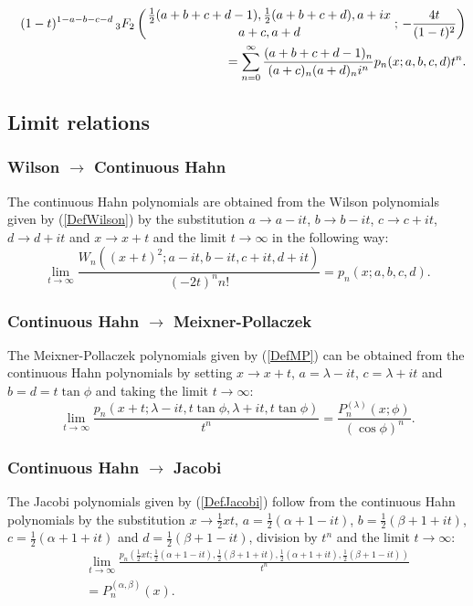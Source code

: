 \documentclass[envcountchap,graybox]{svmono}
\newcounter{rom}
\newcommand{\hyp}[5]{\mbox{}_{#1}{F}_{#2}
\left(\genfrac{}{}{0pt}{}{#3}{#4}\,;\,#5\right)}
\begin{document}
\begin{eqnarray}
\label{GenContHahn3}
& &(1-t)^{1-a-b-c-d}\,\hyp{3}{2}{\frac{1}{2}(a+b+c+d-1),\frac{1}{2}(a+b+c+d),a+ix}
{a+c,a+d}{-\frac{4t}{(1-t)^2}}\nonumber\\
& &{}=\sum_{n=0}^{\infty}
\frac{(a+b+c+d-1)_n}{(a+c)_n(a+d)_ni^n}p_n(x;a,b,c,d)t^n.
\end{eqnarray}

\subsection*{Limit relations}

\subsubsection*{Wilson $\rightarrow$ Continuous Hahn}
The continuous Hahn polynomials are obtained from the Wilson polynomials given by
(\ref{DefWilson}) by the substitution $a\rightarrow a-it$, $b\rightarrow b-it$,
$c\rightarrow c+it$, $d\rightarrow d+it$ and $x\rightarrow x+t$ and the limit
$t\rightarrow\infty$ in the following way:
$$\lim_{t\rightarrow\infty}
\frac{W_n((x+t)^2;a-it,b-it,c+it,d+it)}{(-2t)^nn!}=p_n(x;a,b,c,d).$$

\subsubsection*{Continuous Hahn $\rightarrow$ Meixner-Pollaczek}
The Meixner-Pollaczek polynomials given by (\ref{DefMP}) can be obtained from the
continuous Hahn polynomials by setting $x\rightarrow x+t$, $a=\lambda-it$, $c=\lambda+it$
and $b=d=t\tan\phi$ and taking the limit $t\rightarrow\infty$:
\begin{equation}
\lim_{t\rightarrow\infty}\frac{p_n(x+t;\lambda-it,t\tan\phi,\lambda+it,t\tan\phi)}{t^n}
=\frac{P_n^{(\lambda)}(x;\phi)}{(\cos\phi)^n}.
\end{equation}

\subsubsection*{Continuous Hahn $\rightarrow$ Jacobi}
The Jacobi polynomials given by (\ref{DefJacobi}) follow from the continuous Hahn polynomials
by the substitution $x\rightarrow \frac{1}{2}xt$, $a=\frac{1}{2}(\alpha+1-it)$,
$b=\frac{1}{2}(\beta+1+it)$, $c=\frac{1}{2}(\alpha+1+it)$ and $d=\frac{1}{2}(\beta+1-it)$,
division by $t^n$ and the limit $t\rightarrow\infty$:
\begin{eqnarray}
& &\lim_{t\rightarrow\infty}
\frac{p_n(\frac{1}{2}xt;\frac{1}{2}(\alpha+1-it),\frac{1}{2}(\beta+1+it),
\frac{1}{2}(\alpha+1+it),\frac{1}{2}(\beta+1-it))}{t^n}\nonumber\\
& &{}=P_n^{(\alpha,\beta)}(x).
\end{eqnarray}
\end{document}
